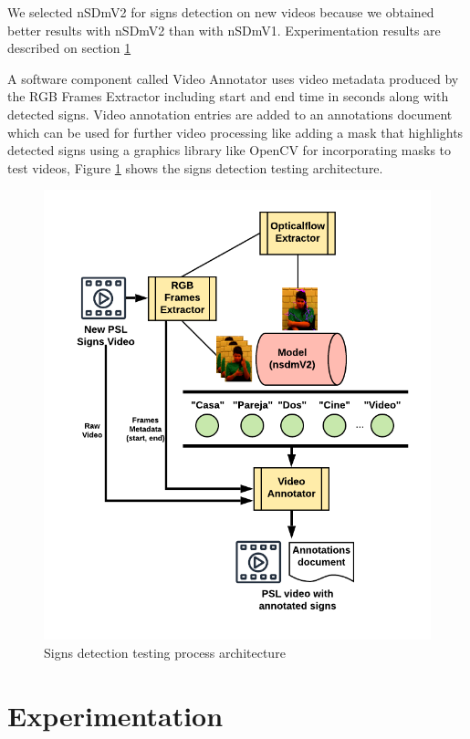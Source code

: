 \documentclass[twocolumn,conference]{article}
\begin{document}
We selected nSDmV2 for signs detection on new videos because we obtained better results with nSDmV2 than with nSDmV1. Experimentation results are described on section \ref{experimentation}

A software component called Video Annotator uses video metadata produced by the RGB Frames Extractor including start and end time in seconds along with detected signs. Video annotation entries are added to an annotations document which can be used for further video processing like adding a mask that highlights detected signs using a graphics library like OpenCV for incorporating masks to test videos, Figure \ref{fig:video-testing-architecture} shows the signs detection testing architecture.
\begin{figure}[hbt!]
\centering
\includegraphics[scale=1.0]{images/new-video-test-architecture.png}
\caption{Signs detection testing process architecture}
\label{fig:video-testing-architecture}
\end{figure}

\section{Experimentation}\label{experimentation}
\end{document}
